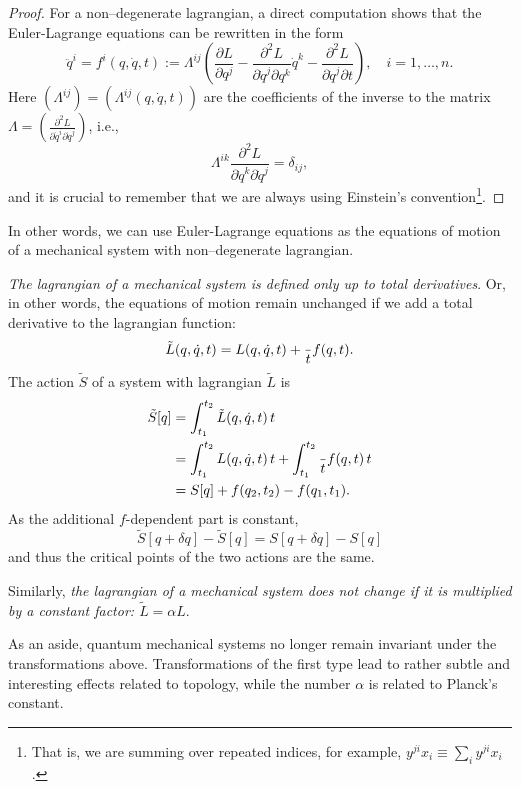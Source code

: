 \documentclass[english,fontsize=11pt,paper=a5,oneside]{scrbook}
\let\d\relax
\DeclareMathOperator{\d}{d}
\theoremstyle{definition}
\newenvironment{remark}
  {\pushQED{\qed}\renewcommand{\qedsymbol}{$\lozenge$}\remarkx}
  {\popQED\endremarkx}
\begin{document}
\begin{proof}
    For a non--degenerate lagrangian, a direct computation shows that the Euler-Lagrange equations can be rewritten in the form
    \begin{equation}
        \ddot q^i = f^i(q,\dot q, t)
        := \Lambda^{ij}\left(\frac{\partial L}{\partial q^j} - \frac{\partial^2 L}{\partial \dot q^j \partial q^k} \dot q^k - \frac{\partial^2 L}{\partial\dot q^j \partial t}\right),
        \quad i=1,\ldots,n.
    \end{equation}
    Here $\left(\Lambda^{ij}\right) = \left(\Lambda^{ij}(q, \dot q, t)\right)$ are the coefficients of the inverse to the matrix $\Lambda = \left(\frac{\partial^2 L}{\partial \dot q^i \partial \dot q^j}\right)$, i.e., 
    \begin{equation}
        \Lambda^{ik} \frac{\partial^2 L}{\partial \dot q^k \partial \dot q^j} = \delta_{ij},
    \end{equation}
    and it is crucial to remember that we are always using Einstein's convention\footnote{That is, we are summing over repeated indices, for example, $y^{ji} x_i \equiv \sum_i y^{ji} x_i$.}.
\end{proof}

In other words, we can use Euler-Lagrange equations as the equations of motion of a mechanical system with non--degenerate lagrangian.

\begin{remark}\label{rmk:manylagrangians}
    \emph{The lagrangian of a mechanical system is defined only up to total derivatives}.
    Or, in other words, the equations of motion remain unchanged if we add a total derivative to the lagrangian function:
    \begin{equation}
        \tilde L(q,\dot q, t) = L(q, \dot q, t) + \frac{\d}{\d t} f(q,t).
    \end{equation}
    The action $\tilde S$ of a system with lagrangian $\tilde L$ is
    \begin{align}
        \tilde S[q] &= \int_{t_1}^{t_2} \tilde L(q, \dot q, t) \,\d t \\
        &= \int_{t_1}^{t_2} L(q, \dot q, t) \,\d t + \int_{t_1}^{t_2} \frac{\d}{\d t} f(q,t) \,\d t \\
        &= S[q] + f(q_2, t_2) - f(q_1, t_1).
    \end{align}
    As the additional $f$-dependent part is constant,
    \begin{equation}
        \tilde S[q+\delta q] - \tilde S[q]
        = S[q+\delta q] - S[q]
    \end{equation}
    and thus the critical points of the two actions are the same.

    Similarly, \emph{the lagrangian of a mechanical system does not change if it is multiplied by a constant factor: $\tilde L = \alpha L$}.

    As an aside, quantum mechanical systems no longer remain invariant under the transformations above. Transformations of the first type lead to rather subtle and interesting effects related to topology, while the number $\alpha$ is related to Planck's constant. 
    \end{remark}
\end{document}
